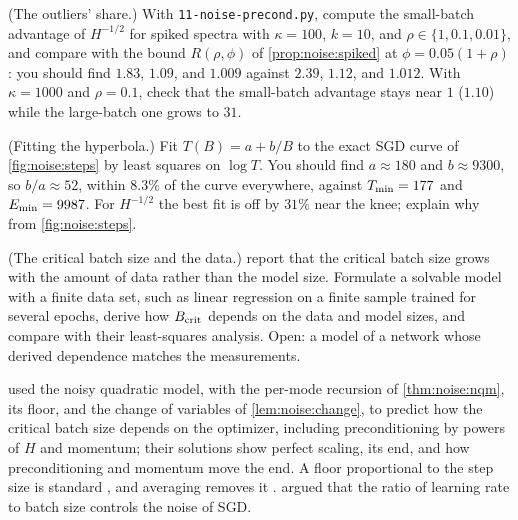 \begin{refsection}
\begin{exercises}
\item \simulation (The outliers' share.) With \texttt{11-noise-precond.py}, compute the small-batch advantage of $H^{-1/2}$ for spiked spectra with $\kappa=100$, $k=10$, and $\rho\in\{1,0.1,0.01\}$, and compare with the bound $R(\rho,\phi)$ of \cref{prop:noise:spiked} at $\phi=0.05(1+\rho)$: you should find $1.83$, $1.09$, and $1.009$ against $2.39$, $1.12$, and $1.012$. With $\kappa=1000$ and $\rho=0.1$, check that the small-batch advantage stays near $1$ ($1.10$) while the large-batch one grows to $31$.\label{ex:noise:simspike}

\item \simulation (Fitting the hyperbola.) Fit $T(B)=a+b/B$ to the exact SGD curve of \cref{fig:noise:steps} by least squares on $\log T$. You should find $a\approx180$ and $b\approx9300$, so $b/a\approx52$, within $8.3\%$ of the curve everywhere, against $T_{\min}=177$ and $E_{\min}=9987$. For $H^{-1/2}$ the best fit is off by $31\%$ near the knee; explain why from \cref{fig:noise:steps}.\label{ex:noise:simfit}

\item \research (The critical batch size and the data.) \Textcite{ZhangEtAl2025CBS} report that the critical batch size grows with the amount of data rather than the model size. Formulate a solvable model with a finite data set, such as linear regression on a finite sample trained for several epochs, derive how $B_{\mathrm{crit}}$ depends on the data and model sizes, and compare with their least-squares analysis. Open: a model of a network whose derived dependence matches the measurements.\label{ex:noise:data}
\end{exercises}

\notesandrefs
\Textcite{ZhangEtAl2019NQM} used the noisy quadratic model, with the per-mode recursion of \cref{thm:noise:nqm}, its floor, and the change of variables of \cref{lem:noise:change}, to predict how the critical batch size depends on the optimizer, including preconditioning by powers of $H$ and momentum; their solutions show perfect scaling, its end, and how preconditioning and momentum move the end. A floor proportional to the step size is standard \parencite{BottouCurtisNocedal2018}, and averaging removes it \parencite{PolyakJuditsky1992}. \Textcite{SmithEtAl2018} argued that the ratio of learning rate to batch size controls the noise of SGD.


\end{refsection}
